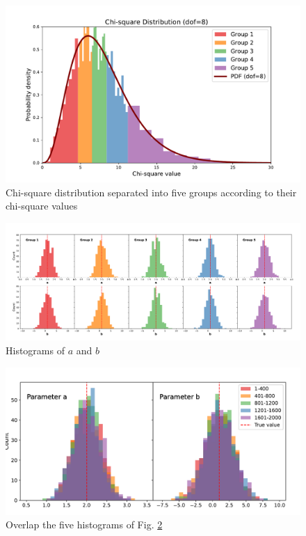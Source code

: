 \documentclass[12pt,a4paper]{article}
\begin{document}
\begin{CJK}{UTF8}{bkai}
\begin{figure}[h]
    \centering
    \includegraphics[width=.9\linewidth]{figures/output/practice_2/output2_1_chi_grouped.pdf}
    \caption{Chi-square distribution separated into five groups according to their chi-square values}
    \label{fig:output_2_1_chi_group}
\end{figure}

\begin{figure}[h]
    \centering
    \includegraphics[width=1\linewidth]{figures/output/practice_2/output2_1.pdf}
    \caption{Histograms of $a$ and $b$}
    \label{fig:output_2_1}
\end{figure}
\clearpage
\begin{figure}[h]
    \centering
    \includegraphics[width=1\linewidth]{figures/output/practice_2/output2_1_combine.pdf}
    \caption{Overlap the five histograms of Fig. \ref{fig:output_2_1}}
    \label{fig:output_2_1_combine}
\end{figure}


\end{CJK}
\end{document}
